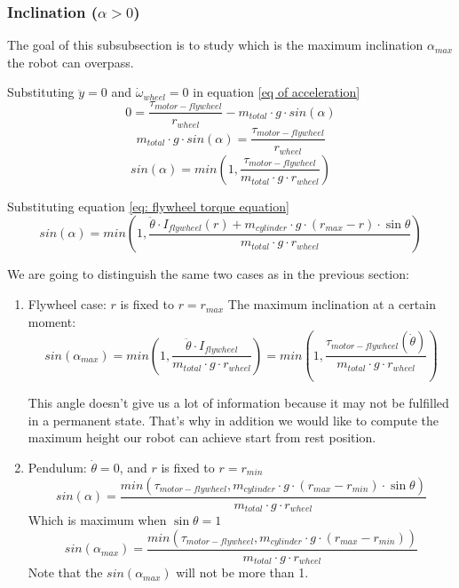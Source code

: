 \subsubsection{Inclination ($\alpha > 0$)}
The goal of this subsubsection is to study which is the maximum inclination $\alpha_{max}$ the robot can overpass.

Substituting $\ddot{y}=0$ and $\dot{\omega}_{wheel} = 0$ in equation \ref{eq of acceleration}
\[0 = \frac{\tau_{motor-flywheel}}{r_{wheel}} - m_{total} \cdot  g \cdot  sin(\alpha)\]
\[m_{total} \cdot  g \cdot  sin(\alpha) = \frac{\tau_{motor-flywheel}}{r_{wheel}} \]
\[sin(\alpha) = min(1,\frac{\tau_{motor-flywheel}}{m_{total} \cdot  g \cdot  r_{wheel}}) \]

Substituting equation \ref{eq: flywheel torque equation}
\[sin(\alpha) = min(1,\frac{\ddot{\theta}\cdot I_{flywheel}(r) + m_{cylinder} \cdot  g \cdot  (r_{max} - r) \cdot  \sin{\theta}}{m_{total} \cdot  g \cdot  r_{wheel}}) \]


We are going to distinguish the same two cases as in the previous section:
\begin{enumerate}
    \item Flywheel case: $r$ is fixed to $r = r_{max}$
    The maximum inclination at a certain moment:
    \begin{equation}\label{Maximum angle using flywheel system}
        \boxed{sin(\alpha_{max}) = min(1,\frac{\ddot{\theta}\cdot I_{flywheel}}{m_{total} \cdot  g \cdot  r_{wheel}}) = min(1,\frac{\tau_{motor-flywheel}(\dot{\theta})}{m_{total} \cdot  g \cdot  r_{wheel}})}
    \end{equation}


    This angle doesn't give us a lot of information because it may not be fulfilled in a 
    permanent state. That's why in addition we would like to compute the maximum height
    our robot can achieve start from rest position.
    \item Pendulum: $\dot{\theta} = 0$, and $r$ is fixed to $r = r_{min}$
    \[sin(\alpha) = \frac{min(\tau_{motor-flywheel},m_{cylinder} \cdot  g \cdot  (r_{max} - r_{min}) \cdot  \sin{\theta})}{m_{total} \cdot  g \cdot  r_{wheel}} \]
    Which is maximum when $\sin{\theta} = 1$
    \begin{equation}\label{Maximum angle using pendulum system}
        \boxed{sin(\alpha_{max}) = \frac{min(\tau_{motor-flywheel},m_{cylinder} \cdot  g \cdot  (r_{max} - r_{min}))}{m_{total} \cdot  g \cdot  r_{wheel}}}
    \end{equation}
    Note that the $sin(\alpha_{max})$ will not be more than 1.
\end{enumerate}

